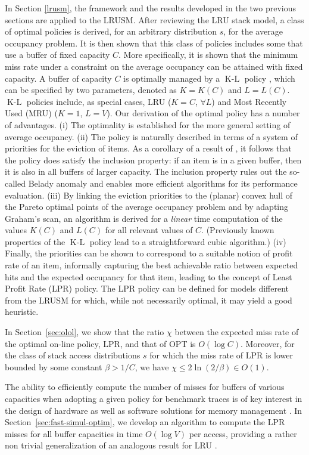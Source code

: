 \documentclass[11pt,a4paper]{article}
\DeclareMathOperator{\kl}{K-L}
\theoremstyle{definition}
\theoremstyle{remark}
\begin{document}
In Section \ref{lrusm}, the framework and the results developed in the
two previous sections are applied to the LRUSM. After reviewing the
LRU stack model, a class of optimal policies is derived, for an
arbitrary distribution $s$, for the average occupancy problem. It is
then shown that this class of policies includes some that use a buffer
of fixed capacity $C$.  More specifically, it is shown that the
minimum miss rate under a constraint on the average occupancy can be
attained with fixed capacity. A buffer of capacity $C$ is optimally
managed by a $\kl$ policy \cite{WoodFL77,WoodFL83}, which can be
specified by two parameters, denoted as $K=K(C)$ and $L=L(C)$.  $\kl$
policies include, as special cases, LRU ($K=C$, $\forall L$) and Most
Recently Used (MRU) ($K=1$, $L=V$). Our derivation of the optimal
policy has a number of advantages. (i) The optimality is established
for the more general setting of average occupancy. (ii) The policy is
naturally described in terms of a system of priorities for the
eviction of items. As a corollary of a result of \cite{MattsonGST70},
it follows that the policy does satisfy the inclusion property: if an
item is in a given buffer, then it is also in all buffers of larger
capacity.  The inclusion property rules out the so-called Belady
anomaly
\cite{BeladyNS69} and enables more efficient algorithms for its
performance evaluation.  (iii) By linking the eviction priorities to
the (planar) convex hull of the Pareto optimal points of the average
occupancy problem and by adapting Graham's scan, an algorithm is
derived for a \emph{linear} time computation of the values $K(C)$ and
$L(C)$ for all relevant values of $C$. (Previously known properties of
the $\kl$ policy lead to a straightforward cubic algorithm.) (iv)
Finally, the priorities can be shown to correspond to a suitable
notion of profit rate of an item, informally capturing the best
achievable ratio between expected hits and the expected occupancy for
that item, leading to the concept of Least Profit Rate (LPR)
policy. The LPR policy can be defined for models different from the
LRUSM for which, while not necessarily optimal, it may yield a good
heuristic.

In Section~\ref{sec:olol}, we show that the ratio $\chi$
between the expected miss rate of the optimal on-line policy, LPR, and
that of OPT is $O(\log C)$. Moreover, for the class of stack access
distributions $s$ for which the miss rate of LPR is lower bounded by
some constant $\beta>1/C$, we have $\chi \leq 2\ln(2/\beta) \in O(1)$.

The ability to efficiently compute the number of misses for buffers of
various capacities when adopting a given policy for benchmark traces
is of key interest in the design of hardware as well as software
solutions for memory management
\cite{BilardiEP11,SugumarA93,ThompsonS89}.
In Section~\ref{sec:fast-simul-optim}, we develop an algorithm to compute the
LPR misses for all buffer capacities in time $O(\log V)$ per access, providing a
rather non trivial generalization of an analogous result for LRU
\cite{BennettK75,AlmasiCP02}.
\end{document}
